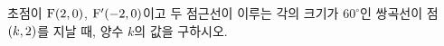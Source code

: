초점이 $\mathrm{F}(2{,}\mkern3mu\mathopen{}0)$, $\mathrm{F'}(-2{,}\mkern3mu\mathopen{}0)$이고 두 점근선이 이루는 각의 크기가 $60^\circ$인 쌍곡선이 점~$(k{,}\mkern3mu\mathopen{}2)$를 지날 때, 양수 $k$의 값을 구하시오. 
